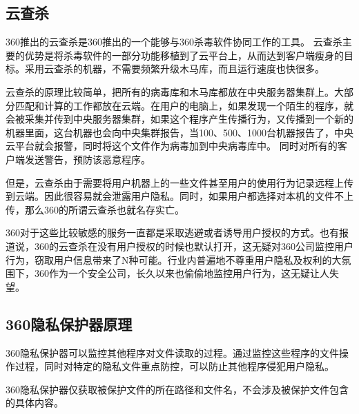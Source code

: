 \documentclass[a4paper]{ctexart}
\begin{document}
    \subsection{云查杀}
    \par 360推出的云查杀是360推出的一个能够与360杀毒软件协同工作的工具。 云查杀主要的优势是将杀毒软件的一部分功能移植到了云平台上，从而达到客户端瘦身的目标。采用云查杀的机器，不需要频繁升级木马库，而且运行速度也快很多。
    \par 云查杀的原理比较简单，把所有的病毒库和木马库都放在中央服务器集群上。大部分匹配和计算的工作都放在云端。在用户的电脑上，如果发现一个陌生的程序，就会被采集并传到中央服务器集群，如果这个程序产生传播行为，又传播到一个新的机器里面，这台机器也会向中央集群报告，当100、500、1000台机器报告了，中央云平台就会报警，同时将这个文件作为病毒加到中央病毒库中。 同时对所有的客户端发送警告，预防该恶意程序。 
    {\color{red}
    \par 但是，云查杀由于需要将用户机器上的一些文件甚至用户的使用行为记录远程上传到云端。因此很容易就会泄露用户隐私。同时，如果用户都选择对本机的文件不上传，那么360的所谓云查杀也就名存实亡。
    \par 360对于这些比较敏感的服务一直都是采取逃避或者诱导用户授权的方式。也有报道说，360的云查杀在没有用户授权的时候也默认打开，这无疑对360公司监控用户行为，窃取用户信息带来了N种可能。行业内普遍地不尊重用户隐私及权利的大氛围下，360作为一个安全公司，长久以来也偷偷地监控用户行为，这无疑让人失望。
}
    \subsection{360隐私保护器原理}
    \par 360隐私保护器可以监控其他程序对文件读取的过程。通过监控这些程序的文件操作过程，同时对特定的隐私文件重点防控，可以防止其他程序侵犯用户隐私。
    \par 360隐私保护器仅获取被保护文件的所在路径和文件名，不会涉及被保护文件包含的具体内容。
\end{document}
